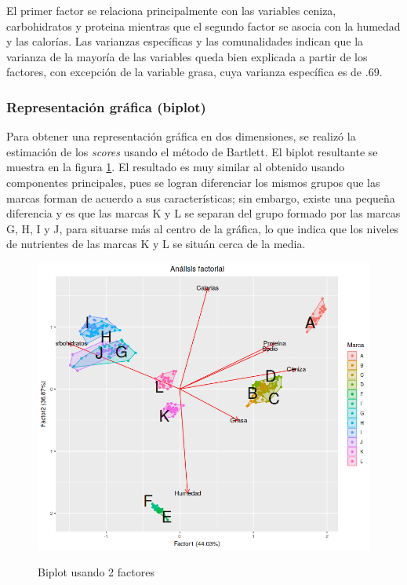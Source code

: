 El primer factor se relaciona principalmente con las variables ceniza, carbohidratos y proteina mientras que el segundo factor se asocia con la humedad y las calorías. Las varianzas específicas y las comunalidades indican que la varianza de la mayoría de las variables queda bien explicada a partir de los factores, con excepción de la variable grasa, cuya varianza específica es de $.69$.

\subsubsection{Representación gráfica (biplot)}

Para obtener una representación gráfica en dos dimensiones, se realizó la estimación de los \textit{scores} usando el método de Bartlett. El biplot resultante se muestra en la figura \ref{i_biplot_Factores}. El resultado es muy similar al obtenido usando componentes principales, pues se logran diferenciar los mismos grupos que las marcas forman de acuerdo a sus características; sin embargo, existe una pequeña diferencia y es que las marcas K y L se separan del grupo formado por las marcas G, H, I y J, para situarse más al centro de la gráfica, lo que indica que los niveles de nutrientes de las marcas K y L se situán cerca de la media.

\begin{figure}[h]
\centering
	\includegraphics[scale=.75]{images/biplotFactores.png} 
	\label{i_biplot_Factores}
	\caption{Biplot usando 2 factores}
\end{figure}